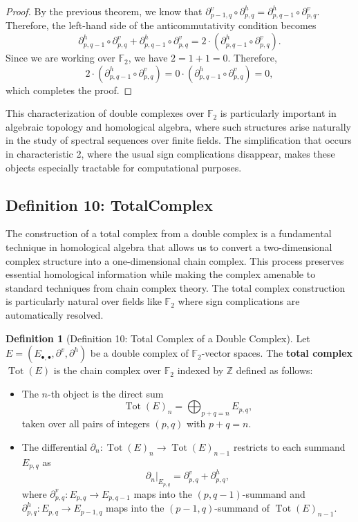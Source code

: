 \documentclass[11pt]{article}
\theoremstyle{plain}
\theoremstyle{definition}
\newtheorem*{definition}{Definition}
\theoremstyle{remark}
\begin{document}
\begin{proof}
By the previous theorem, we know that $\partial^v_{p-1,q} \circ \partial^h_{p,q} = \partial^h_{p,q-1} \circ \partial^v_{p,q}$. Therefore, the left-hand side of the anticommutativity condition becomes
\[
\partial^h_{p,q-1} \circ \partial^v_{p,q} + \partial^h_{p,q-1} \circ \partial^v_{p,q} = 2 \cdot (\partial^h_{p,q-1} \circ \partial^v_{p,q}).
\]
Since we are working over $\mathbb{F}_2$, we have $2 = 1 + 1 = 0$. Therefore,
\[
2 \cdot (\partial^h_{p,q-1} \circ \partial^v_{p,q}) = 0 \cdot (\partial^h_{p,q-1} \circ \partial^v_{p,q}) = 0,
\]
which completes the proof.
\end{proof}

This characterization of double complexes over $\mathbb{F}_2$ is particularly important in algebraic topology and homological algebra, where such structures arise naturally in the study of spectral sequences over finite fields. The simplification that occurs in characteristic 2, where the usual sign complications disappear, makes these objects especially tractable for computational purposes.

\vspace{1em}

\subsection{Definition 10: TotalComplex}

The construction of a total complex from a double complex is a fundamental technique in homological algebra that allows us to convert a two-dimensional complex structure into a one-dimensional chain complex. This process preserves essential homological information while making the complex amenable to standard techniques from chain complex theory. The total complex construction is particularly natural over fields like $\mathbb{F}_2$ where sign complications are automatically resolved.

\begin{definition}[Definition 10: Total Complex of a Double Complex]
Let $E = (E_{\bullet,\bullet}, \partial^v, \partial^h)$ be a double complex of $\mathbb{F}_2$-vector spaces. The \textbf{total complex} $\operatorname{Tot}(E)$ is the chain complex over $\mathbb{F}_2$ indexed by $\mathbb{Z}$ defined as follows:
\begin{itemize}
  \item The $n$-th object is the direct sum
    \[
      \operatorname{Tot}(E)_n = \bigoplus_{p+q=n} E_{p,q},
    \]
    taken over all pairs of integers $(p,q)$ with $p + q = n$.
  \item The differential $\partial_n \colon \operatorname{Tot}(E)_n \to \operatorname{Tot}(E)_{n-1}$ restricts to each summand $E_{p,q}$ as
    \[
      \partial_n\big|_{E_{p,q}} = \partial^v_{p,q} + \partial^h_{p,q},
    \]
    where $\partial^v_{p,q} \colon E_{p,q} \to E_{p,q-1}$ maps into the $(p, q-1)$-summand and $\partial^h_{p,q} \colon E_{p,q} \to E_{p-1,q}$ maps into the $(p-1,q)$-summand of $\operatorname{Tot}(E)_{n-1}$.
\end{itemize}
\end{definition}
\end{document}
